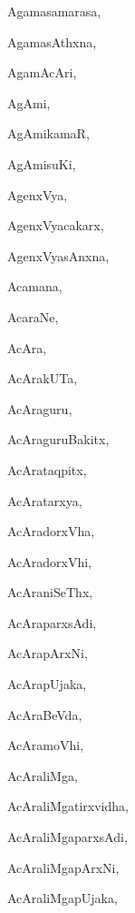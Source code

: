 \begin{multicols}{3}
{\noindent
{Agamasamarasa}, \pageref{Agamasamarasa}

\noindent
{AgamasAthxna}, \pageref{AgamasAthxna}

\noindent
{AgamAcAri}, \pageref{AgamAcAri}

\noindent
{AgAmi}, \pageref{AgAmi}

\noindent
{AgAmikamaR}, \pageref{AgAmikamaR}

\noindent
{AgAmisuKi}, \pageref{AgAmisuKi}

\noindent
{AgenxVya}, \pageref{AgenxVya}

\noindent
{AgenxVyacakarx}, \pageref{AgenxVyacakarx}

\noindent
{AgenxVyasAnxna}, \pageref{AgenxVyasAnxna}

\noindent
{Acamana}, \pageref{Acamana}

\noindent
{AcaraNe}, \pageref{AcaraNe}

\noindent
{AcAra}, \pageref{AcAra}

\noindent
{AcArakUTa}, \pageref{AcArakUTa}

\noindent
{AcAraguru}, \pageref{AcAraguru}

\noindent
{AcAraguruBakitx}, \pageref{AcAraguruBakitx}

\noindent
{AcArataqpitx}, \pageref{AcArataqpitx}

\noindent
{AcAratarxya}, \pageref{AcAratarxya}

\noindent
{AcAradorxVha}, \pageref{AcAradorxVha}

\noindent
{AcAradorxVhi}, \pageref{AcAradorxVhi}

\noindent
{AcAraniSeThx}, \pageref{AcAraniSeThx}

\noindent
{AcAraparxsAdi}, \pageref{AcAraparxsAdi}

\noindent
{AcArapArxNi}, \pageref{AcArapArxNi}

\noindent
{AcArapUjaka}, \pageref{AcArapUjaka}

\noindent
{AcAraBeVda}, \pageref{AcAraBeVda}

\noindent
{AcAramoVhi}, \pageref{AcAramoVhi}

\noindent
{AcAraliMga}, \pageref{AcAraliMga}

\noindent
{AcAraliMgatirxvidha}, \pageref{AcAraliMgatirxvidha}

\noindent
{AcAraliMgaparxsAdi}, \pageref{AcAraliMgaparxsAdi}

\noindent
{AcAraliMgapArxNi}, \pageref{AcAraliMgapArxNi}

\noindent
{AcAraliMgapUjaka}, \pageref{AcAraliMgapUjaka}

}
\end{multicols}
